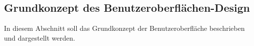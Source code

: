 \subsection{Grundkonzept des Benutzeroberflächen-Design}
\label{subsec:grundkonzept-des-benutzeroberflachen-design}

In diesem Abschnitt soll das Grundkonzept der Benutzeroberfläche beschrieben und dargestellt werden.